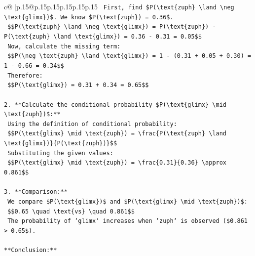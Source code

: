 \documentclass{article}
\begin{document}
{\begin{supertabular}{c@{$\;$}|p{.15\linewidth}@{}p{.15\linewidth}p{.15\linewidth}p{.15\linewidth}p{.15\linewidth}p{.15\linewidth}}
{{{\texttt{    First, find \$P(\textbackslash{}text\{zuph\} \textbackslash{}land \textbackslash{}neg \textbackslash{}text\{glimx\})\$. We know \$P(\textbackslash{}text\{zuph\}) = 0.36\$.} \\
\texttt{    \$\$P(\textbackslash{}text\{zuph\} \textbackslash{}land \textbackslash{}neg \textbackslash{}text\{glimx\}) = P(\textbackslash{}text\{zuph\}) {-} P(\textbackslash{}text\{zuph\} \textbackslash{}land \textbackslash{}text\{glimx\}) = 0.36 {-} 0.31 = 0.05\$\$} \\
\texttt{    Now, calculate the missing term:} \\
\texttt{    \$\$P(\textbackslash{}neg \textbackslash{}text\{zuph\} \textbackslash{}land \textbackslash{}text\{glimx\}) = 1 {-} (0.31 + 0.05 + 0.30) = 1 {-} 0.66 = 0.34\$\$} \\
\texttt{    Therefore:} \\
\texttt{    \$\$P(\textbackslash{}text\{glimx\}) = 0.31 + 0.34 = 0.65\$\$} \\
\\ 
\texttt{2.  **Calculate the conditional probability \$P(\textbackslash{}text\{glimx\} \textbackslash{}mid \textbackslash{}text\{zuph\})\$:**} \\
\texttt{    Using the definition of conditional probability:} \\
\texttt{    \$\$P(\textbackslash{}text\{glimx\} \textbackslash{}mid \textbackslash{}text\{zuph\}) = \textbackslash{}frac\{P(\textbackslash{}text\{zuph\} \textbackslash{}land \textbackslash{}text\{glimx\})\}\{P(\textbackslash{}text\{zuph\})\}\$\$} \\
\texttt{    Substituting the given values:} \\
\texttt{    \$\$P(\textbackslash{}text\{glimx\} \textbackslash{}mid \textbackslash{}text\{zuph\}) = \textbackslash{}frac\{0.31\}\{0.36\} \textbackslash{}approx 0.861\$\$} \\
\\ 
\texttt{3.  **Comparison:**} \\
\texttt{    We compare \$P(\textbackslash{}text\{glimx\})\$ and \$P(\textbackslash{}text\{glimx\} \textbackslash{}mid \textbackslash{}text\{zuph\})\$:} \\
\texttt{    \$\$0.65 \textbackslash{}quad \textbackslash{}text\{vs\} \textbackslash{}quad 0.861\$\$} \\
\texttt{    The probability of `glimx` increases when `zuph` is observed (\$0.861 > 0.65\$).} \\
\\ 
\texttt{**Conclusion:**} \\
}}}
\end{supertabular}}
\end{document}
